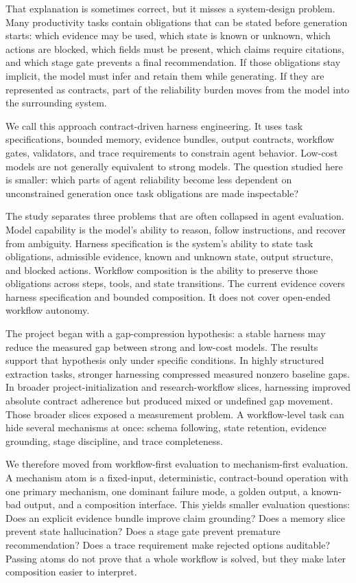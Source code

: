 \documentclass[11pt]{article}
\begin{document}
That explanation is sometimes correct, but it misses a system-design problem. Many productivity tasks contain obligations that can be stated before generation starts: which evidence may be used, which state is known or unknown, which actions are blocked, which fields must be present, which claims require citations, and which stage gate prevents a final recommendation. If those obligations stay implicit, the model must infer and retain them while generating. If they are represented as contracts, part of the reliability burden moves from the model into the surrounding system.

We call this approach contract-driven harness engineering. It uses task specifications, bounded memory, evidence bundles, output contracts, workflow gates, validators, and trace requirements to constrain agent behavior. Low-cost models are not generally equivalent to strong models. The question studied here is smaller: which parts of agent reliability become less dependent on unconstrained generation once task obligations are made inspectable?

The study separates three problems that are often collapsed in agent evaluation. Model capability is the model's ability to reason, follow instructions, and recover from ambiguity. Harness specification is the system's ability to state task obligations, admissible evidence, known and unknown state, output structure, and blocked actions. Workflow composition is the ability to preserve those obligations across steps, tools, and state transitions. The current evidence covers harness specification and bounded composition. It does not cover open-ended workflow autonomy.

The project began with a gap-compression hypothesis: a stable harness may reduce the measured gap between strong and low-cost models. The results support that hypothesis only under specific conditions. In highly structured extraction tasks, stronger harnessing compressed measured nonzero baseline gaps. In broader project-initialization and research-workflow slices, harnessing improved absolute contract adherence but produced mixed or undefined gap movement. Those broader slices exposed a measurement problem. A workflow-level task can hide several mechanisms at once: schema following, state retention, evidence grounding, stage discipline, and trace completeness.

We therefore moved from workflow-first evaluation to mechanism-first evaluation. A mechanism atom is a fixed-input, deterministic, contract-bound operation with one primary mechanism, one dominant failure mode, a golden output, a known-bad output, and a composition interface. This yields smaller evaluation questions: Does an explicit evidence bundle improve claim grounding? Does a memory slice prevent state hallucination? Does a stage gate prevent premature recommendation? Does a trace requirement make rejected options auditable? Passing atoms do not prove that a whole workflow is solved, but they make later composition easier to interpret.
\end{document}

